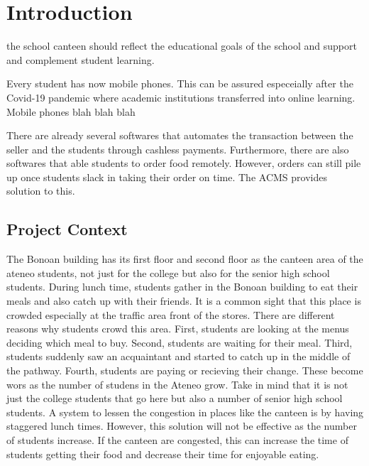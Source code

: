 \documentclass{article}
\author{Jonel C. Ganalon}
\date{19 March 2024}
\begin{document}
\section{Introduction}
the school canteen should reflect the educational goals of the school and support and complement student learning.

Every student has now mobile phones. This can be assured especeially after the Covid-19 pandemic where academic institutions transferred into online learning. Mobile phones blah blah blah 

There are already several softwares that automates the transaction between the seller and the students through cashless payments. Furthermore, there are also softwares that able students to order food remotely. However, orders can still pile up once students slack in taking their order on time. The ACMS provides solution to this.

\subsection{Project Context}
The Bonoan building has its first floor and second floor as the canteen area of the ateneo students, not just for the college but also for the senior high school students.
During lunch time, students gather in the Bonoan building to eat their meals and also catch up with their friends. It is a common sight that this place is crowded especially at the traffic area front of the stores. There are different reasons why students crowd this area. First, students are looking at the menus deciding which meal to buy. Second, students are waiting for their meal. Third, students suddenly saw an acquaintant and started to catch up in the middle of the pathway. Fourth, students are paying or recieving their change. These become wors as the number of studens in the Ateneo grow. Take in mind that it is not just the college students that go here but also a number of senior high school students. A system to lessen the congestion in places like the canteen is by having staggered lunch times. However, this solution will not be effective as the number of students increase. If the canteen are congested, this can increase the time of students getting their food and decrease their time for enjoyable eating.

\end{document}
